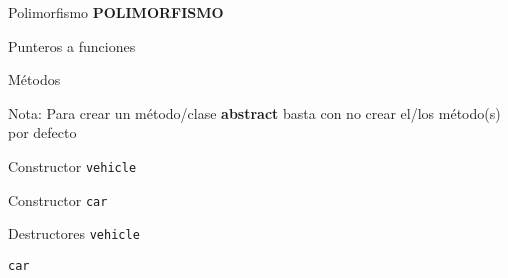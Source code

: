 \documentclass{mybeamer}
\begin{document}
\begin{framesec}{Polimorfismo}
	\centering
	\bfseries \Huge POLIMORFISMO
\end{framesec}

\begin{framesubsec}{Punteros a funciones}
	
\end{framesubsec}

\begin{framesubsec}{Métodos}
	

	Nota: Para crear un método/clase \textbf{abstract\MVAt} basta con no
	crear el/los método(s) por defecto
\end{framesubsec}

\begin{framesubsec}{Constructor \texttt{vehicle}}
	
\end{framesubsec}

\begin{framesubsec}{Constructor \texttt{car}}
	
\end{framesubsec}

\begin{framesubsec}{Destructores}
	\texttt{vehicle}
	
	\texttt{car}
	
\end{framesubsec}
\end{document}
